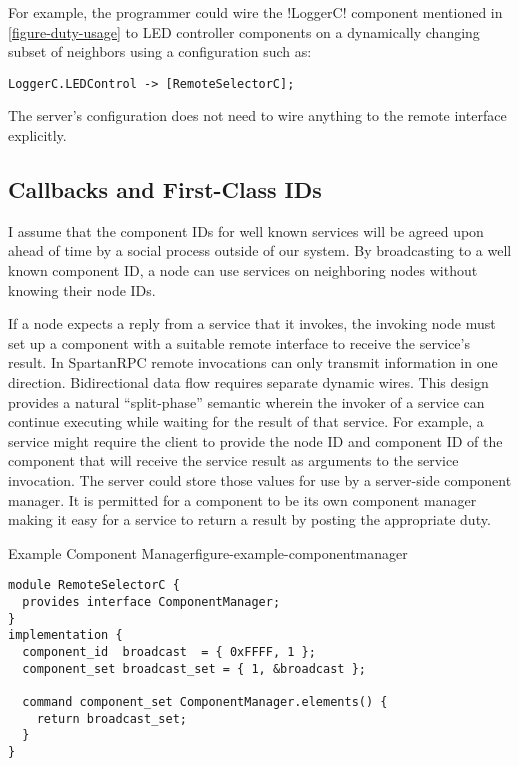 For example, the programmer could wire the !LoggerC! component mentioned in
\autoref{figure-duty-usage} to LED controller components on a dynamically changing subset of
neighbors using a configuration such as:
\begin{lstlisting}
LoggerC.LEDControl -> [RemoteSelectorC];
\end{lstlisting}

The server's configuration does not need to wire anything to the remote interface explicitly.

\subsection{Callbacks and First-Class IDs}

I assume that the component IDs for well known services will be agreed upon ahead of time by a
social process outside of our system. By broadcasting to a well known component ID, a node can
use services on neighboring nodes without knowing their node IDs.

If a node expects a reply from a service that it invokes, the invoking node must set up a
component with a suitable remote interface to receive the service's result. In SpartanRPC remote
invocations can only transmit information in one direction. Bidirectional data flow requires
separate dynamic wires. This design provides a natural ``split-phase'' semantic wherein the
invoker of a service can continue executing while waiting for the result of that service. For
example, a service might require the client to provide the node ID and component ID of the
component that will receive the service result as arguments to the service invocation. The
server could store those values for use by a server-side component manager. It is permitted for
a component to be its own component manager making it easy for a service to return a result by
posting the appropriate duty.

\begin{fpfig}[t]{Example Component Manager}{figure-example-componentmanager}
{
\singlespace
\begin{lstlisting}
module RemoteSelectorC {
  provides interface ComponentManager;
}
implementation {
  component_id  broadcast  = { 0xFFFF, 1 };
  component_set broadcast_set = { 1, &broadcast };

  command component_set ComponentManager.elements() {
    return broadcast_set;
  }
}
\end{lstlisting}
\primaryspacing
}
\end{fpfig}


